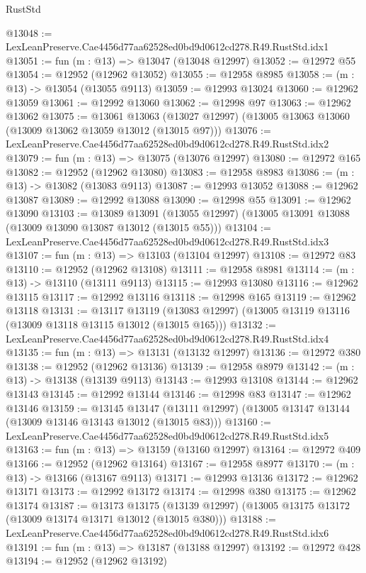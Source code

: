 \begin{lexlean}{RustStd}
\begin{coremodule}
@13048 := LexLeanPreserve.Cae4456d77aa62528ed0bd9d0612cd278.R49.RustStd.idx1
@13051 := fun (m : @13) => @13047 (@13048 @12997)
@13052 := @12972 @55
@13054 := @12952 (@12962 @13052)
@13055 := @12958 @8985
@13058 := (m : @13) -> @13054 (@13055 @9113)
@13059 := @12993 @13024
@13060 := @12962 @13059
@13061 := @12992 @13060
@13062 := @12998 @97
@13063 := @12962 @13062
@13075 := @13061
    @13063
    (@13027 @12997)
    (@13005 @13063 @13060 (@13009 @13062 @13059 @13012 (@13015 @97)))
@13076 := LexLeanPreserve.Cae4456d77aa62528ed0bd9d0612cd278.R49.RustStd.idx2
@13079 := fun (m : @13) => @13075 (@13076 @12997)
@13080 := @12972 @165
@13082 := @12952 (@12962 @13080)
@13083 := @12958 @8983
@13086 := (m : @13) -> @13082 (@13083 @9113)
@13087 := @12993 @13052
@13088 := @12962 @13087
@13089 := @12992 @13088
@13090 := @12998 @55
@13091 := @12962 @13090
@13103 := @13089
    @13091
    (@13055 @12997)
    (@13005 @13091 @13088 (@13009 @13090 @13087 @13012 (@13015 @55)))
@13104 := LexLeanPreserve.Cae4456d77aa62528ed0bd9d0612cd278.R49.RustStd.idx3
@13107 := fun (m : @13) => @13103 (@13104 @12997)
@13108 := @12972 @83
@13110 := @12952 (@12962 @13108)
@13111 := @12958 @8981
@13114 := (m : @13) -> @13110 (@13111 @9113)
@13115 := @12993 @13080
@13116 := @12962 @13115
@13117 := @12992 @13116
@13118 := @12998 @165
@13119 := @12962 @13118
@13131 := @13117
    @13119
    (@13083 @12997)
    (@13005 @13119 @13116 (@13009 @13118 @13115 @13012 (@13015 @165)))
@13132 := LexLeanPreserve.Cae4456d77aa62528ed0bd9d0612cd278.R49.RustStd.idx4
@13135 := fun (m : @13) => @13131 (@13132 @12997)
@13136 := @12972 @380
@13138 := @12952 (@12962 @13136)
@13139 := @12958 @8979
@13142 := (m : @13) -> @13138 (@13139 @9113)
@13143 := @12993 @13108
@13144 := @12962 @13143
@13145 := @12992 @13144
@13146 := @12998 @83
@13147 := @12962 @13146
@13159 := @13145
    @13147
    (@13111 @12997)
    (@13005 @13147 @13144 (@13009 @13146 @13143 @13012 (@13015 @83)))
@13160 := LexLeanPreserve.Cae4456d77aa62528ed0bd9d0612cd278.R49.RustStd.idx5
@13163 := fun (m : @13) => @13159 (@13160 @12997)
@13164 := @12972 @409
@13166 := @12952 (@12962 @13164)
@13167 := @12958 @8977
@13170 := (m : @13) -> @13166 (@13167 @9113)
@13171 := @12993 @13136
@13172 := @12962 @13171
@13173 := @12992 @13172
@13174 := @12998 @380
@13175 := @12962 @13174
@13187 := @13173
    @13175
    (@13139 @12997)
    (@13005 @13175 @13172 (@13009 @13174 @13171 @13012 (@13015 @380)))
@13188 := LexLeanPreserve.Cae4456d77aa62528ed0bd9d0612cd278.R49.RustStd.idx6
@13191 := fun (m : @13) => @13187 (@13188 @12997)
@13192 := @12972 @428
@13194 := @12952 (@12962 @13192)

\end{coremodule}
\end{lexlean}
